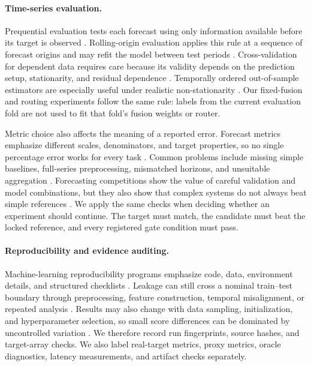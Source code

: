 \paragraph{Time-series evaluation.}
Prequential evaluation tests each forecast using only information available before its target is observed \cite{dawid1984prequential}.  Rolling-origin evaluation applies this rule at a sequence of forecast origins and may refit the model between test periods \cite{tashman2000oos}.  Cross-validation for dependent data requires care because its validity depends on the prediction setup, stationarity, and residual dependence \cite{bergmeir2012cv}.  Temporally ordered out-of-sample estimators are especially useful under realistic non-stationarity \cite{cerqueira2020evaluation}.  Our fixed-fusion and routing experiments follow the same rule: labels from the current evaluation fold are not used to fit that fold's fusion weights or router.

Metric choice also affects the meaning of a reported error.  Forecast metrics emphasize different scales, denominators, and target properties, so no single percentage error works for every task \cite{hyndman2006measures}.  Common problems include missing simple baselines, full-series preprocessing, mismatched horizons, and unsuitable aggregation \cite{hewamalage2023pitfalls}.  Forecasting competitions show the value of careful validation and model combinations, but they also show that complex systems do not always beat simple references \cite{makridakis2022m5}.  We apply the same checks when deciding whether an experiment should continue.  The target must match, the candidate must beat the locked reference, and every registered gate condition must pass.

\paragraph{Reproducibility and evidence auditing.}
Machine-learning reproducibility programs emphasize code, data, environment details, and structured checklists \cite{pineau2021reproducibility}.  Leakage can still cross a nominal train--test boundary through preprocessing, feature construction, temporal misalignment, or repeated analysis \cite{kapoor2023leakage}.  Results may also change with data sampling, initialization, and hyperparameter selection, so small score differences can be dominated by uncontrolled variation \cite{bouthillier2021variance}.  We therefore record run fingerprints, source hashes, and target-array checks.  We also label real-target metrics, proxy metrics, oracle diagnostics, latency measurements, and artifact checks separately.

